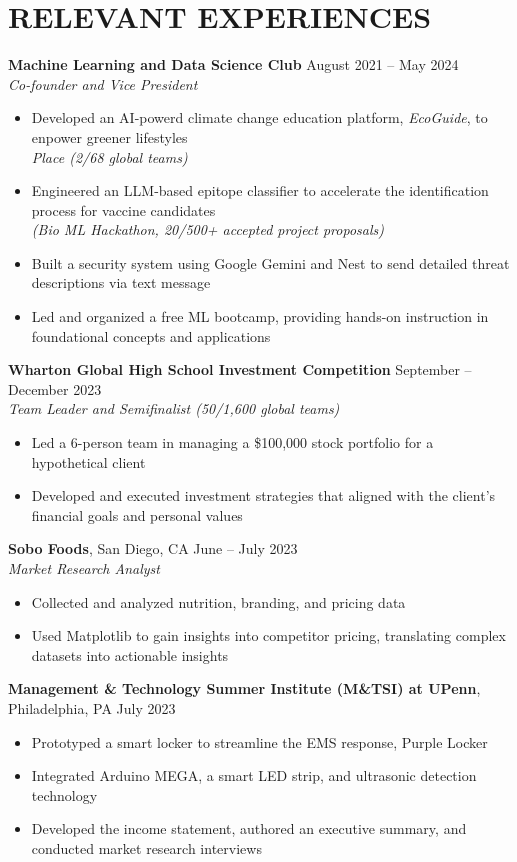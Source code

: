 \section*{RELEVANT EXPERIENCES}

\noindent
\textbf{Machine Learning and Data Science Club} \hfill August 2021 -- May 2024 \\
\textit{Co-founder and Vice President}
\begin{itemize}
	\item Developed an AI-powerd climate change education platform, \textit{EcoGuide}, to enpower greener lifestyles \\ \textit{ Place (2/68 global teams)}
	\item Engineered an LLM-based epitope classifier to accelerate the identification process for vaccine candidates \\ \textit{(Bio ML Hackathon, 20/500+ accepted project proposals)}
	\item Built a security system using Google Gemini and Nest to send detailed threat descriptions via text message
	\item Led and organized a free ML bootcamp, providing hands-on instruction in foundational concepts and  applications \\
\end{itemize}

\noindent
\textbf{Wharton Global High School Investment Competition} \hfill September -- December 2023 \\
\textit{Team Leader and Semifinalist (50/1,600 global teams)}
\begin{itemize}
	\item Led a 6-person team in managing a \$100,000 stock portfolio for a hypothetical client
	\item Developed and executed investment strategies that aligned with the client's financial goals and personal values \\
\end{itemize}

\noindent
\textbf{Sobo Foods}, San Diego, CA \hfill June -- July 2023 \\
\textit{Market Research Analyst}
\begin{itemize}
	\item Collected and analyzed nutrition, branding, and pricing data
	\item Used Matplotlib to gain insights into competitor pricing, translating complex datasets into actionable insights \\
\end{itemize}

\noindent
\textbf{Management \& Technology Summer Institute (M\&TSI) at UPenn}, Philadelphia, PA \hfill July 2023
\begin{itemize}
	\item Prototyped a smart locker to streamline the EMS response, Purple Locker
	\item Integrated Arduino MEGA, a smart LED strip, and ultrasonic detection technology
	\item Developed the income statement, authored an executive summary, and conducted market research interviews
\end{itemize}
